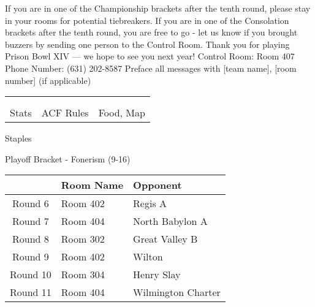 \documentclass{article}%
\begin{document}
\vspace*{30pt}%
\linebreak%
If you are in one of the Championship brackets after the tenth round, please stay in your rooms for potential tiebreakers.\newline%
\newline%
If you are in one of the Consolation brackets after the tenth round, you are free to go {-} let us know if you brought buzzers by sending one person to the Control Room.\newline%
\newline%
Thank you for playing Prison Bowl XIV — we hope to see you next year!\newline%
\newline%
Control Room: Room 407\newline%
Phone Number: (631) 202{-}8587\newline%
Preface all messages with {[}team name{]}, {[}room number{]} (if applicable)%
\vspace*{30pt}%
\newline%
%
\begin{tabularx}{\textwidth}{YYY}%
  &  &  \\%
\\%
Stats&ACF Rules&Food, Map\\%
\end{tabularx}%
\newpage%
\begin{center}%
\begin{Huge}%
Staples%
\end{Huge}%
\vspace*{12pt}%
\linebreak%
\begin{Large}%
Playoff Bracket {-} Fonerism (9{-}16)%
\end{Large}%
\end{center}%
\vspace*{4pt}%
%
\begin{tabularx}{\textwidth}{|c|Y|Y|}%
\hline%
&Room Name&Opponent\\%
\hline%
Round 6&Room 402&Regis A\\%
Round 7&Room 404&North Babylon A\\%
Round 8&Room 302&Great Valley B\\%
Round 9&Room 402&Wilton\\%
Round 10&Room 304&Henry Slay\\%
Round 11&Room 404&Wilmington Charter\\%
\hline%
\end{tabularx}%
\end{document}
